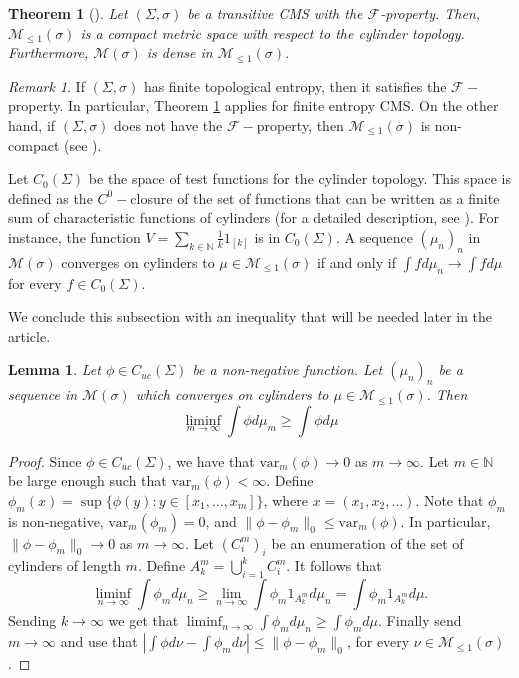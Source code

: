 \documentclass[letterpaper,11pt]{amsart}
\theoremstyle{plain}
\newtheorem{theorem}{Theorem}[section]
\theoremstyle{plain}
\newtheorem{lemma}[proposition]{Lemma}
\theoremstyle{definition}
\theoremstyle{remark}
\newtheorem{remark}{Remark}[section]
\def\N{{\mathbb N}}
\def\M{{\mathcal M}}
\def\F{{\mathcal F}}
\begin{document}
\begin{theorem}[{\cite[Theorem 1.2]{iv}}] \label{compact} Let $(\Sigma, \sigma)$ be a transitive CMS with the $\F$-property. Then, $\M_{\le 1}(\sigma)$ is a compact metric space with respect to the cylinder topology. Furthermore, $\M(\sigma)$ is dense in $\M_{\le 1}(\sigma)$. \end{theorem}

\begin{remark} If $(\Sigma,\sigma)$ has finite topological entropy, then it satisfies the $\F-$property. In particular, Theorem \ref{compact} applies for finite entropy CMS. On the other hand, if $(\Sigma,\sigma)$ does not have the $\F-$property, then $\M_{\le 1}(\sigma)$ is non-compact (see \cite[Proposition 4.19]{iv}).
\end{remark}

Let $C_0(\Sigma)$ be the space of test functions for the cylinder topology. This space is defined as the $C^0-$closure of the set of functions that can be written as a finite sum of characteristic functions of cylinders (for a detailed description, see \cite[Section 3.4]{iv}). For instance, the function $V=\sum_{k\in\N}\frac{1}{k}1_{[k]}$ is in $C_0(\Sigma)$. A sequence $(\mu_n)_n$ in $\M(\sigma)$ converges on cylinders to $\mu \in \M_{\le 1}(\sigma)$ if and only if $\int f d\mu_n \to \int f d\mu$ for every $f \in C_0(\Sigma)$. 

We conclude this subsection with an inequality that will be needed later in the article.

\begin{lemma}\label{tired} Let $\phi\in C_{uc}(\Sigma)$ be a non-negative function. Let $(\mu_n)_n$ be a sequence in $\M(\sigma)$ which converges on cylinders to $\mu\in\M_{\le 1
}(\sigma)$. Then 
$$\liminf_{m\to\infty}\int \phi d\mu_m\ge \int \phi d\mu$$
\end{lemma}
\begin{proof}  Since $\phi\in C_{uc}(\Sigma)$, we have that $\text{var}_m(\phi)\to 0$ as $m\to\infty$. Let $m\in\N$ be large enough such that $\text{var}_m(\phi)<\infty$. Define $\phi_m(x)=\sup\{\phi(y):y\in[x_1,\ldots, x_{m}]\}$, where $x=(x_1,x_2,\ldots)$. Note that $\phi_m$ is non-negative, $\text{var}_m(\phi_m)=0$, and $\|\phi-\phi_m\|_0\le \text{var}_m(\phi)$. In particular, $\|\phi-\phi_m\|_0\to 0$ as $m\to\infty$. Let $(C_i^m)_i$ be an enumeration of the set of cylinders of length $m$. Define $A^m_k=\bigcup_{i=1}^k C_i^m$. It follows that 
$$\liminf_{n\to\infty}\int \phi_md\mu_n\ge \lim_{n\to\infty}\int \phi_m 1_{A^m_k}d\mu_n=\int \phi_m 1_{A_k^m}d\mu.$$
Sending $k\to \infty$ we get that $\liminf_{n\to\infty}\int \phi_md\mu_n\ge  \int \phi_md\mu.$ Finally send $m\to\infty$ and use that $|\int \phi d\nu-\int \phi_m d\nu|\le \|\phi-\phi_m\|_0$, for every $\nu\in\M_{\le 1}(\sigma)$.
\end{proof}
\end{document}
